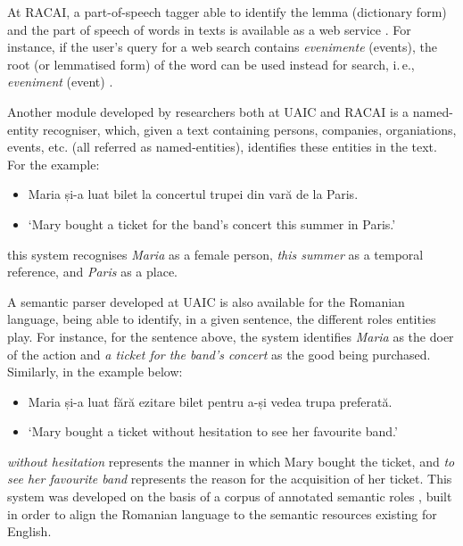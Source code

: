 \begin{multicols}{2}
At RACAI, a part-of-speech tagger able to identify the lemma (dictionary form) and the part of speech of words in texts is available as a web service \cite{webservicesUrl}. For instance, if the user’s query for a web search contains \textit{evenimente} (events), the root (or lemmatised form) of the word can be used instead for search, i.\,e., \textit{eveniment} (event) \cite{webservicesArt}. 

Another module developed by researchers both at UAIC and RACAI is a named-entity recogniser, which, given a text containing persons, companies, organiations, events, etc. (all referred as named-entities), identifies these entities in the text. For the example:

\begin{example}
\begin{itemize}
\item []Maria și-a luat bilet la concertul trupei din vară de la Paris.
\item []`Mary bought a ticket for the band’s concert this summer in Paris.'
\end{itemize}
\end{example}

\noindent this system recognises \textit{Maria} as a female person, \textit{this summer} as a temporal reference, and \textit{Paris} as a place.

A semantic parser developed at UAIC \cite{isda} is also available for the Romanian language, being able to identify, in a given sentence, the different roles entities play. For instance, for the sentence above, the system identifies \textit{Maria} as the doer of the action and \textit{a ticket for the band’s concert} as the good being purchased. Similarly, in the example below: 

\begin{example}
\begin{itemize}
\item []Maria și-a luat fără ezitare bilet pentru a-și vedea trupa preferată.
\item []`Mary bought a ticket without hesitation to see her favourite band.'
\end{itemize}
\end{example}

\noindent\textit{without hesitation} represents the manner in which Mary bought the ticket, and \textit{to see her favourite band} represents  the reason for the acquisition of her ticket. This system was developed on the basis of a corpus of annotated semantic roles \cite{trandabat}, built in order to align the Romanian language to the semantic resources existing for English.


\end{multicols}
